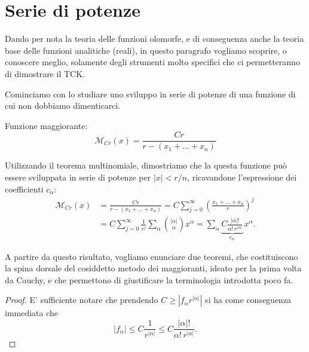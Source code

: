 \newpage
\section{Serie di potenze}\label{seriedipotenze}
Dando per nota la teoria delle funzioni olomorfe, e di conseguenza anche la teoria base delle funzioni analitiche (reali), in questo paragrafo vogliamo scoprire, o conoscere meglio, solamente degli strumenti molto specifici che ci permetteranno di dimostrare il TCK.

Cominciamo con lo studiare uno sviluppo in serie di potenze di una funzione di cui non dobbiamo dimenticarci.
\begin{definition}
Funzione maggiorante: $$\mathcal{M}_{Cr}(x)=\frac{Cr}{r-(x_1+\ldots +x_n)}$$
\end{definition}
Utilizzando il teorema multinomiale, dimostriamo che la questa funzione può essere sviluppata in serie di potenze per $|x|<r/n$, ricavandone l'espressione dei coefficienti $c_\alpha$:
\begin{align*}
\mathcal{M}_{Cr}(x) &= \frac{Cr}{r-(x_1+\ldots +x_n)} = C \sum\limits_{j=0}^\infty \left(\frac{x_1+\ldots +x_n}{r}\right)^j  \\
&= C \sum\limits_{j=0}^\infty \frac{1}{r^j} \sum\limits_\alpha  \binom{|\alpha |}{\alpha } x^\alpha = \sum\limits_\alpha 
\underbrace{C \frac{|\alpha |!}{\alpha ! \, r^{|\alpha |}}}_{c_\alpha} \, x^\alpha .
\end{align*}

A partire da questo risultato, vogliamo enunciare due teoremi, che costituiscono la spina dorsale del cosiddetto metodo dei maggioranti, ideato per la prima volta da Cauchy, e che permettono di giustificare la terminologia introdotta poco fa.

\begin{theorem}\label{teomagg}
\end{theorem}


\begin{theorem}\label{costrmagg}
\end{theorem}

\begin{proof}
E' sufficiente notare che prendendo $C \geq |f_\alpha r^{|\alpha |}|$ si ha come conseguenza immediata che
$$|f_\alpha | \leq C \frac{1}{r^{|\alpha |}} \leq C \frac{|\alpha |!}{\alpha ! \, r^{|\alpha |}}.$$
\end{proof}


